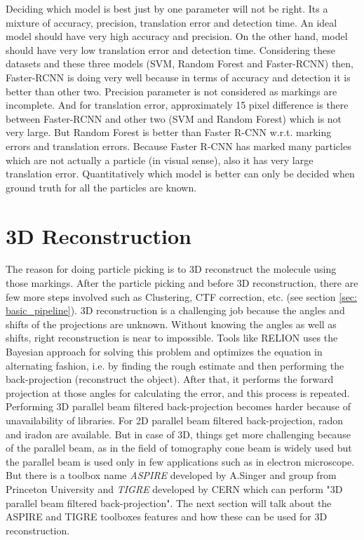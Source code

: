 \documentclass[twoside]{iitbreport}
\begin{document}
Deciding which model is best just by one parameter will not be right. Its a mixture of accuracy, precision, translation error and detection time. An ideal model should have very high accuracy and precision. On the other hand, model should have very low translation error and detection time. Considering these datasets and these three models (SVM, Random Forest and Faster-RCNN) then, Faster-RCNN is doing very well because in terms of accuracy and detection it is better than other two. Precision parameter is not considered as markings are incomplete. And for translation error, approximately 15 pixel difference is there between Faster-RCNN and other two (SVM and Random Forest) which is not very large. But Random Forest is better than Faster R-CNN w.r.t. marking errors and translation errors. Because Faster R-CNN has marked many particles which are not actually a particle (in visual sense), also it has very large translation error. Quantitatively which model is better can only be decided when ground truth for all the particles are known. 

\chapter{3D Reconstruction}
The reason for doing particle picking is to 3D reconstruct the molecule using those markings. After the particle picking and before 3D reconstruction, there are few more steps involved such as Clustering, CTF correction, etc. (see section \ref{sec: basic_pipeline}). 3D reconstruction is a challenging job because the angles and shifts of the projections are unknown. Without knowing the angles as well as shifts, right reconstruction is near to impossible. Tools like RELION uses the Bayesian \cite{scheres2012relion} approach for solving this problem and optimizes the equation in alternating fashion, i.e. by finding the rough estimate and then performing the back-projection (reconstruct the object). After that, it performs the forward projection at those angles for calculating the error, and this process is repeated. \\

Performing 3D parallel beam filtered back-projection becomes harder because of unavailability of libraries. For 2D parallel beam filtered back-projection, radon and iradon are available. But in case of 3D, things get more challenging because of the parallel beam, as in the field of tomography cone beam is widely used but the parallel beam is used only in few applications such as in electron microscope. But there is a toolbox name \textit{ASPIRE} developed by A.Singer and group from Princeton University and \textit{TIGRE} developed by CERN which can perform "3D parallel beam filtered back-projection". The next section will talk about the ASPIRE and TIGRE toolboxes features and how these can be used for 3D reconstruction.
\end{document}
